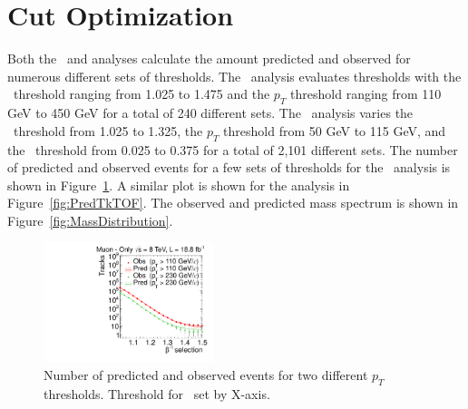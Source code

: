 \section{Cut Optimization \label{sec:Optim}}
Both the \muononly\ and \tktof analyses calculate the amount predicted and observed for numerous different sets of thresholds. The \muononly\ analysis evaluates thresholds
with the \invbeta\ threshold ranging from 1.025 to 1.475 and the $p_T$ threshold ranging from 110 GeV to 450 GeV for a total of 240 different sets. The \tktof\ analysis
varies the \invbeta\ threshold from 1.025 to 1.325, the $p_T$ threshold from 50 GeV to 115 GeV, and the \ias\ threshold from 0.025 to 0.375 for a total of 2,101 different sets.
The number of predicted and observed events for a few sets of thresholds for the \muononly\ analysis is shown in Figure~\ref{fig:PredPt230}. A similar plot is shown for the 
\tktof analysis in Figure~\ref{fig:PredTkTOF}. The observed and predicted mass spectrum is shown in Figure~\ref{fig:MassDistribution}.

\begin{figure}
\centering
  \includegraphics[clip=true, trim=0.0cm 0cm 2.8cm 0cm, width=0.44\textwidth]{figures/muonly/Prediction_Data8TeV_NPredVsNObs}
  \caption{Number of predicted and observed events for two different $p_T$ thresholds. Threshold for \invbeta\ set by X-axis.
    \label{fig:PredPt230}}
\end{figure}

